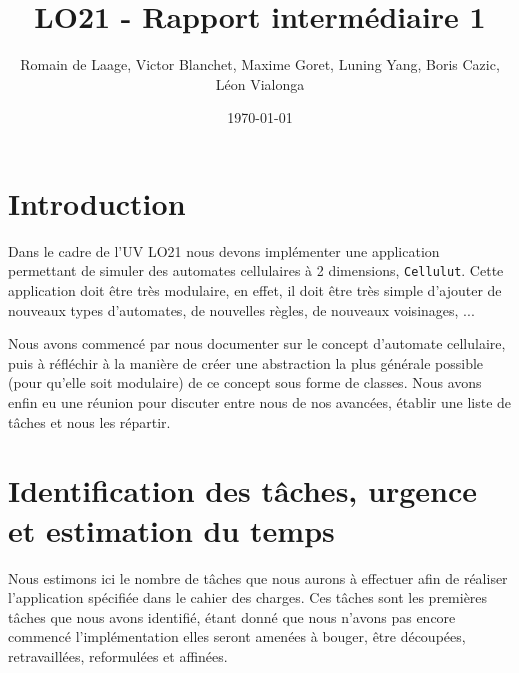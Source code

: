 \documentclass[11pt]{article}
\title{LO21 - Rapport intermédiaire 1}
\author{Romain de Laage, Victor Blanchet, Maxime Goret, Luning Yang, Boris Cazic, Léon Vialonga}
\date{\today}
\begin{document}
\maketitle
\thispagestyle{fancy}

\section{Introduction}

Dans le cadre de l'UV LO21 nous devons implémenter une application permettant de simuler des automates cellulaires à 2 dimensions, \texttt{Cellulut}. Cette application doit être très modulaire, en effet, il doit être très simple d'ajouter de nouveaux types d'automates, de nouvelles règles, de nouveaux voisinages, ...

\medskip

Nous avons commencé par nous documenter sur le concept d'automate cellulaire, puis à réfléchir à la manière de créer une abstraction la plus générale possible (pour qu'elle soit modulaire) de ce concept sous forme de classes. Nous avons enfin eu une réunion pour discuter entre nous de nos avancées, établir une liste de tâches et nous les répartir.

\section{Identification des tâches, urgence et estimation du temps}

Nous estimons ici le nombre de tâches que nous aurons à effectuer afin de réaliser l'application spécifiée dans le cahier des charges. Ces tâches sont les premières tâches que nous avons identifié, étant donné que nous n'avons pas encore commencé l'implémentation elles seront amenées à bouger, être découpées, retravaillées, reformulées et affinées.

\bigskip
\end{document}
